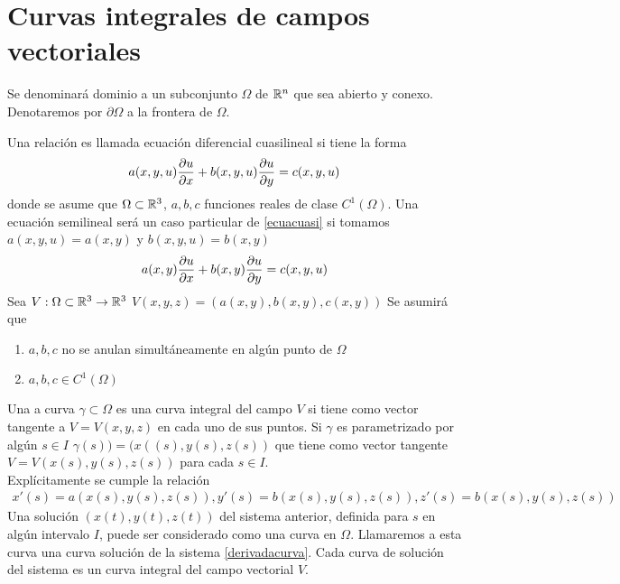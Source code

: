 \section{Curvas integrales de campos vectoriales}
\begin{Def}
    Se denominará dominio a un subconjunto $\Omega$ de ${\mathbb{R}}^n$ que sea abierto y conexo. Denotaremos por $\partial\Omega$ a la frontera de $\Omega$.
\end{Def}
Una relación es llamada ecuación diferencial cuasilineal si tiene la forma
\begin{eqnarray}
    \label{ecuacuasi}
    a(x,y,u)\frac{\partial u}{\partial x}+b(x,y,u)\frac{\partial u}{\partial y}=c(x,y,u)
\end{eqnarray}
donde se asume que $\Omega\subset{\mathbb{R}}^3$, $a,b,c$ funciones reales de clase $C^1(\Omega)$.
Una ecuación semilineal será un caso particular de \ref{ecuacuasi} si tomamos $a(x,y,u)=a(x,y)$ y $b(x,y,u)=b(x,y)$
\begin{eqnarray}
\label{ecuasemi} 
a(x,y)\frac{\partial u}{\partial x}+b(x,y)\frac{\partial u}{\partial y}=c(x,y,u) 
\end{eqnarray}
Sea $V:\Omega\subset{\mathbb{R}}^3\rightarrow{\mathbb{R}}^3$ $V(x,y,z)=(a(x,y),b(x,y),c(x,y))$
Se asumirá que 
\begin{enumerate}
    \item  $a,b,c$ no se anulan simultáneamente en algún punto de $\Omega$
    \item $a,b,c\in C^1(\Omega)$
\end{enumerate}
\begin{Def}
    Una a curva $\gamma\subset\Omega$ es una curva integral del campo $V$ si tiene como vector tangente a $V=V(x,y,z)$ en cada uno de sus puntos. Si $\gamma$ es parametrizado por algún $s\in I$
    $\gamma(s))=(x((s),y(s),z(s))$ que tiene como vector tangente $V=V(x(s),y(s),z(s))$ para cada $s\in I$.\\
    Explícitamente se cumple la relación 
    \begin{eqnarray}
        x'(s)=a(x(s),y(s),z(s)) , y'(s)=b(x(s),y(s),z(s)) , z'(s)=b(x(s),y(s),z(s))\label{derivadacurva}
    \end{eqnarray}
    Una solución $(x (t), y (t), z (t))$ del sistema anterior, definida para $s$ en algún intervalo $I$, puede ser considerado como una curva en $\Omega$. Llamaremos a esta curva una curva solución de la
    sistema \ref{derivadacurva}. Cada curva de solución del sistema es un
    curva integral del campo vectorial $V$.
\end{Def}